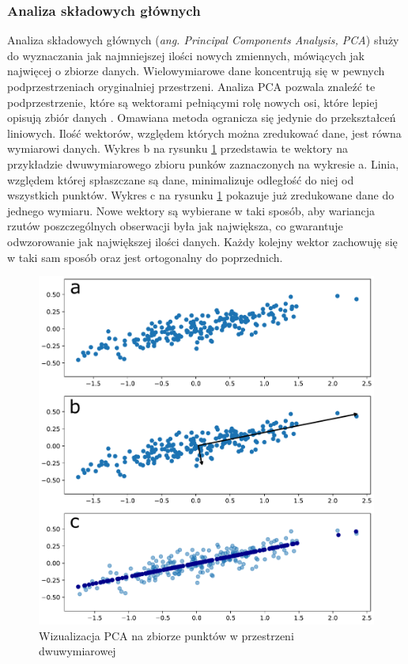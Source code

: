 \documentclass[a4paper,12pt,oneside]{book} %
\begin{document}
\subsubsection{Analiza składowych głównych}
Analiza składowych głównych (\textit{ang. Principal Components Analysis, PCA}) służy do wyznaczania jak najmniejszej ilości nowych zmiennych, mówiących jak najwięcej o zbiorze danych. Wielowymiarowe dane koncentrują się w pewnych podprzestrzeniach oryginalniej przestrzeni. Analiza PCA pozwala znaleźć te podprzestrzenie, które są wektorami pełniącymi rolę nowych osi, które lepiej opisują zbiór danych \cite{redukcjawymiarow}. Omawiana metoda ogranicza się jedynie do przekształceń liniowych. Ilość wektorów, względem których można zredukować dane, jest równa wymiarowi danych. Wykres b na rysunku \ref{fig:pca} przedstawia te wektory na przykładzie dwuwymiarowego zbioru punków zaznaczonych na wykresie a. Linia, względem której spłaszczane są dane, minimalizuje odległość do niej od wszystkich punktów. Wykres c na rysunku \ref{fig:pca} pokazuje już zredukowane dane do jednego wymiaru. Nowe wektory są wybierane w taki sposób, aby wariancja rzutów poszczególnych obserwacji była jak największa, co gwarantuje odwzorowanie jak największej ilości danych. Każdy kolejny wektor zachowuję się w taki sam sposób oraz jest ortogonalny do poprzednich.
\begin{figure}[h!]
	\centering
	\includegraphics[width=15cm]{pca.pdf}
	\caption{Wizualizacja PCA na zbiorze punktów w przestrzeni dwuwymiarowej}
	\label{fig:pca}
\end{figure}
\end{document}
